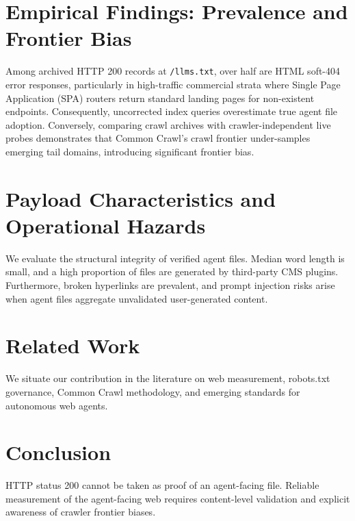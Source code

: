 \documentclass[sigconf,anonymous,review]{acmart}
\begin{document}
\section{Empirical Findings: Prevalence and Frontier Bias}
Among archived HTTP 200 records at \texttt{/llms.txt}, over half are HTML soft-404 error responses, particularly in high-traffic commercial strata where Single Page Application (SPA) routers return standard landing pages for non-existent endpoints. Consequently, uncorrected index queries overestimate true agent file adoption. Conversely, comparing crawl archives with crawler-independent live probes demonstrates that Common Crawl's crawl frontier under-samples emerging tail domains, introducing significant frontier bias.

\section{Payload Characteristics and Operational Hazards}
We evaluate the structural integrity of verified agent files. Median word length is small, and a high proportion of files are generated by third-party CMS plugins. Furthermore, broken hyperlinks are prevalent, and prompt injection risks arise when agent files aggregate unvalidated user-generated content.

\section{Related Work}
We situate our contribution in the literature on web measurement, robots.txt governance, Common Crawl methodology, and emerging standards for autonomous web agents.

\section{Conclusion}
HTTP status 200 cannot be taken as proof of an agent-facing file. Reliable measurement of the agent-facing web requires content-level validation and explicit awareness of crawler frontier biases.



\end{document}
